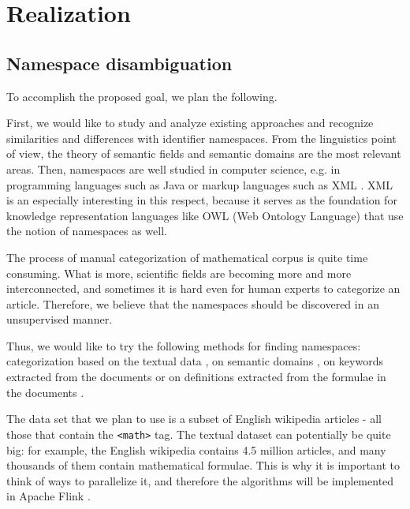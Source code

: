 \documentclass[12pt,a4paper]{article}
\begin{document}


\section{Realization}
\subsection{Namespace disambiguation}

To accomplish the proposed goal, we plan the following.

First, we would like to study and analyze existing approaches and recognize similarities and differences with identifier namespaces. From the linguistics point of view, the theory of semantic fields \cite{source:vassilyev74} and semantic domains \cite{source:gliozzo09} are the most relevant areas. Then, namespaces are well studied in computer science, e.g. in programming languages such as Java \cite{source:java_gosling14} or markup languages such as XML \cite{source:xml_bray99}. XML is an especially interesting in this respect, because it serves as the foundation for knowledge representation languages like OWL (Web Ontology Language) \cite{source:xml_mcguinnes04} that use the notion of namespaces as well.

The process of manual categorization of mathematical corpus is quite time consuming. What is more, scientific fields are becoming more and more interconnected, and sometimes it is hard even for human experts to categorize an article. Therefore, we believe that the namespaces should be discovered in an unsupervised manner.

Thus, we would like to try the following methods for finding namespaces: categorization based on the textual data \cite{source:sebastiani02}, on semantic domains \cite{source:gliozzo09}, on keywords extracted from the documents \cite{source:schoneberg14} or on definitions extracted from the formulae in the documents \cite{source:mlpp}.

The data set that we plan to use is a subset of English wikipedia articles - all those that contain the \texttt{<math>} tag. The textual dataset can potentially be quite big: for example, the English wikipedia contains 4.5 million articles, and many thousands of them contain mathematical formulae. This is why it is important to think of ways to parallelize it, and therefore the algorithms will be implemented in Apache Flink \cite{source:flink}.
\end{document}

